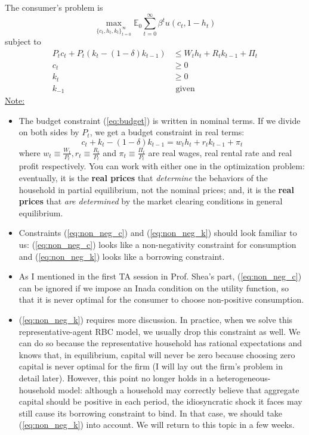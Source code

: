 \documentclass[12pt]{article}
\begin{document}
	The consumer's problem is 
	\begin{equation}
		\max_{\{c_t, h_t, k_t\}_{t=0}^\infty} \mathbb{E}_0\sum_{t=0}^\infty \beta^t u(c_t, 1-h_t)
	\end{equation}
	subject to
	\begin{align}
		P_t c_t + P_t (k_t - (1-\delta)k_{t-1}) & \leq W_th_t + R_t k_{t-1} + \Pi_t \label{eq:budget}\\
		c_t & \geq 0 \label{eq:non_neg_c}\\
		k_t & \geq 0 \label{eq:non_neg_k}\\
		k_{-1} &\text{ given}
	\end{align}
	\underline{Note:} 
	\begin{itemize}
		\item The budget constraint (\ref{eq:budget}) is written in nominal terms. If we divide on both sides by $P_t$, we get a budget constraint in real terms:
		\begin{equation}
			c_t + k_t - (1-\delta)k_{t-1} = w_t h_t + r_t k_{t-1} + \pi_t
		\end{equation}
	where $w_t \equiv \frac{W_t}{P_t}, r_t \equiv \frac{R_t}{P_t}$ and $\pi_t \equiv \frac{\Pi_t}{P_t}$ are real wages, real rental rate and real profit respectively. You can work with either one in the optimization problem: eventually, it is the \textbf{real prices} that \textit{determine} the behaviors of the household in partial equilibrium, not the nominal prices; and, it is the \textbf{real prices} that \textit{are determined} by the market clearing conditions in general equilibrium.
		\item Constraints (\ref{eq:non_neg_c}) and (\ref{eq:non_neg_k}) should look familiar to us: (\ref{eq:non_neg_c}) looks like a non-negativity constraint for consumption and (\ref{eq:non_neg_k}) looks like a borrowing constraint. 
		\item As I mentioned in the first TA session in Prof. Shea's part, (\ref{eq:non_neg_c}) can be ignored if we impose an Inada condition on the utility function, so that it is never optimal for the consumer to choose non-positive consumption.
		\item (\ref{eq:non_neg_k}) requires more discussion. In practice, when we solve this representative-agent RBC model, we usually drop this constraint as well. We can do so because the representative household has rational expectations and knows that, in equilibrium, capital will never be zero because choosing zero capital is never optimal for the firm (I will lay out the firm's problem in detail later). However, this point no longer holds in a heterogeneous-household model: although a household may correctly believe that aggregate capital should be positive in each period, the idiosyncratic shock it faces may still cause its borrowing constraint to bind. In that case, we should take (\ref{eq:non_neg_k}) into account. We will return to this topic in a few weeks.
	\end{itemize}
\end{document}
